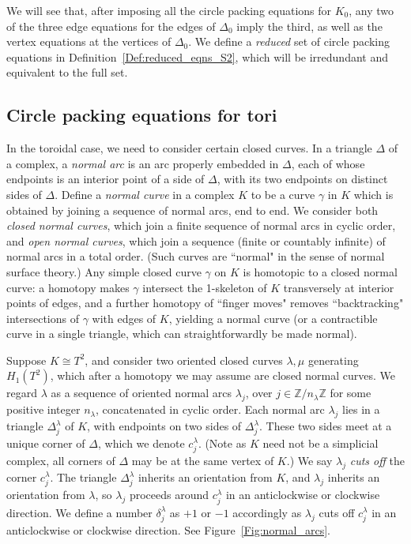 \documentclass[12pt]{amsart}
\numberwithin{equation}{section}
\theoremstyle{named}
\newcommand{\refdef}[1]{Definition~\ref{Def:#1}}
\newcommand{\reffig}[1]{Figure~\ref{Fig:#1}}
\newcommand{\Z}{\mathbb{Z}}
\begin{document}
We will see that, after imposing all the circle packing equations for $K_0$, any two of the three edge equations for the edges of $\Delta_0$ imply the third, as well as the vertex equations at the vertices of $\Delta_0$. We define a \emph{reduced} set of circle packing equations in \refdef{reduced_eqns_S2}, which will be irredundant and equivalent to the full set.

\subsection{Circle packing equations for tori}
\label{Sec:circle_packing_eqns_tori}

In the toroidal case, we need to consider certain closed curves. In a triangle $\Delta$ of a complex, a \emph{normal arc} is an arc properly embedded in $\Delta$, each of whose endpoints is an interior point of a side of $\Delta$, with its two endpoints on distinct sides of $\Delta$. Define a \emph{normal curve} in a complex $K$ to be a curve $\gamma$ in $K$ which is obtained by joining a sequence of normal arcs, end to end. We consider both \emph{closed normal curves}, which join a finite sequence of normal arcs in cyclic order, and \emph{open normal curves}, which join a sequence (finite or countably infinite) of normal arcs in a total order. (Such curves are ``normal" in the sense of normal surface theory.) Any simple closed curve $\gamma$ on $K$ is homotopic to a closed normal curve: a homotopy makes $\gamma$ intersect the 1-skeleton of $K$ transversely at interior points of edges, and a further homotopy of ``finger moves" removes ``backtracking" intersections of $\gamma$ with edges of $K$, yielding a normal curve (or a contractible curve in a single triangle, which can straightforwardly be made normal).

Suppose $K \cong T^2$, and consider two oriented closed curves $\lambda, \mu$ generating $H_1 (T^2)$, which after a homotopy we may assume are closed normal curves. We regard $\lambda$ as a sequence of oriented normal arcs $\lambda_j$, over $j \in \Z/n_\lambda \Z$ for some positive integer $n_\lambda$, concatenated in cyclic order. Each normal arc $\lambda_j$ lies in a triangle $\Delta^\lambda_j$ of $K$, with endpoints on two sides of $\Delta^\lambda_j$. These two sides meet at a unique corner of $\Delta$, which we denote $c^\lambda_j$. (Note as $K$ need not be a simplicial complex, all corners of $\Delta$ may be at the same vertex of $K$.) We say $\lambda_j$ \emph{cuts off} the corner $c^\lambda_j$. The triangle $\Delta^\lambda_j$ inherits an orientation from $K$, and $\lambda_j$ inherits an orientation from $\lambda$, so $\lambda_j$ proceeds around $c^\lambda_j$ in an anticlockwise or clockwise direction. We define a number $\delta^\lambda_j$ as $+1$ or $-1$ accordingly as $\lambda_j$ cuts off $c^\lambda_j$ in an anticlockwise or clockwise direction. See \reffig{normal_arcs}.
\end{document}
